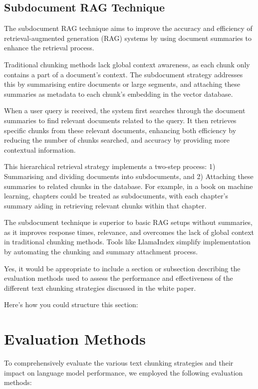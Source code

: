\documentclass[
  letterpaper,
  DIV=11,
  numbers=noendperiod]{scrartcl}
\begin{document}
\subsection{Subdocument RAG Technique}\label{subdocument-rag-technique}

The subdocument RAG technique aims to improve the accuracy and
efficiency of retrieval-augmented generation (RAG) systems by using
document summaries to enhance the retrieval process.

Traditional chunking methods lack global context awareness, as each
chunk only contains a part of a document's context. The subdocument
strategy addresses this by summarising entire documents or large
segments, and attaching these summaries as metadata to each chunk's
embedding in the vector database.

When a user query is received, the system first searches through the
document summaries to find relevant documents related to the query. It
then retrieves specific chunks from these relevant documents, enhancing
both efficiency by reducing the number of chunks searched, and accuracy
by providing more contextual information.

This hierarchical retrieval strategy implements a two-step process: 1)
Summarising and dividing documents into subdocuments, and 2) Attaching
these summaries to related chunks in the database. For example, in a
book on machine learning, chapters could be treated as subdocuments,
with each chapter's summary aiding in retrieving relevant chunks within
that chapter.

The subdocument technique is superior to basic RAG setups without
summaries, as it improves response times, relevance, and overcomes the
lack of global context in traditional chunking methods. Tools like
LlamaIndex simplify implementation by automating the chunking and
summary attachment process.

Yes, it would be appropriate to include a section or subsection
describing the evaluation methods used to assess the performance and
effectiveness of the different text chunking strategies discussed in the
white paper.

Here's how you could structure this section:

\section{Evaluation Methods}\label{evaluation-methods}

To comprehensively evaluate the various text chunking strategies and
their impact on language model performance, we employed the following
evaluation methods:
\end{document}
